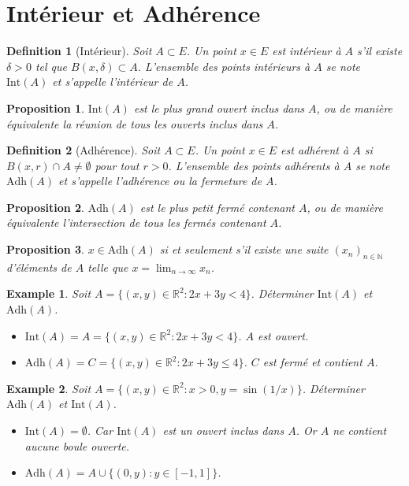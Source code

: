 \documentclass{article}
\newtheorem{proposition}{Proposition}
\newtheorem{definition}{Definition}
\newtheorem{example}{Example}
\begin{document}
\section{Intérieur et Adhérence}

\begin{definition}[Intérieur]
Soit $A \subset E$. Un point $x \in E$ est intérieur à $A$ s'il existe $\delta > 0$ tel que $B(x, \delta) \subset A$. L'ensemble des points intérieurs à $A$ se note $\mathrm{Int}(A)$ et s'appelle l'intérieur de $A$.
\end{definition}

\begin{proposition}
$\mathrm{Int}(A)$ est le plus grand ouvert inclus dans $A$, ou de manière équivalente la réunion de tous les ouverts inclus dans $A$.
\end{proposition}

\begin{definition}[Adhérence]
Soit $A \subset E$. Un point $x \in E$ est adhérent à $A$ si $B(x, r) \cap A \neq \emptyset$ pour tout $r > 0$. L'ensemble des points adhérents à $A$ se note $\mathrm{Adh}(A)$ et s'appelle l'adhérence ou la fermeture de $A$.
\end{definition}

\begin{proposition}
$\mathrm{Adh}(A)$ est le plus petit fermé contenant $A$, ou de manière équivalente l'intersection de tous les fermés contenant $A$.
\end{proposition}

\begin{proposition}
$x \in \mathrm{Adh}(A)$ si et seulement s'il existe une suite $(x_n)_{n \in \mathbb{N}}$ d'éléments de $A$ telle que $x = \lim_{n \to \infty} x_n$.
\end{proposition}

\begin{example}
Soit $A = \{(x,y) \in \mathbb{R}^2 : 2x+3y < 4\}$. Déterminer $\mathrm{Int}(A)$ et $\mathrm{Adh}(A)$.
\begin{itemize}
    \item $\mathrm{Int}(A) = A = \{(x,y) \in \mathbb{R}^2 : 2x+3y < 4\}$. $A$ est ouvert.
    \item $\mathrm{Adh}(A) = C = \{(x,y) \in \mathbb{R}^2 : 2x+3y \leq 4\}$. $C$ est fermé et contient $A$.
\end{itemize}
\end{example}

\begin{example}
Soit $A = \{(x,y) \in \mathbb{R}^2 : x > 0, y = \sin(1/x)\}$. Déterminer $\mathrm{Adh}(A)$ et $\mathrm{Int}(A)$.
\begin{itemize}
    \item $\mathrm{Int}(A) = \emptyset$. Car $\mathrm{Int}(A)$ est un ouvert inclus dans $A$. Or $A$ ne contient aucune boule ouverte.
    \item $\mathrm{Adh}(A) = A \cup \{(0,y) : y \in [-1, 1]\}$.
\end{itemize}
\end{example}
\end{document}
